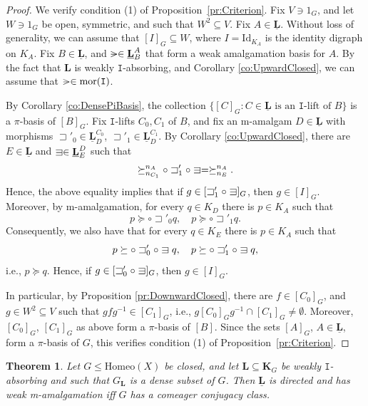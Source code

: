 \documentclass[12pt]{amsart}
\numberwithin{equation}{section}
\theoremstyle{plain}
\newtheorem{theorem}{Theorem}[section]
\theoremstyle{definition}
\newcommand{\nil}{\mathrel{\vphantom{>}\text{\mathsurround=0pt\ooalign{$>$\cr$-$\cr}}}}
\newcommand{\sqni}{\mathrel{\vphantom{\sqsupset}\text{\mathsurround=0pt\ooalign{$\sqsupset$\cr$-$\cr}}}}
\newcommand \Homeo{ \mbox{Homeo}}
\newcommand \Id{ \mbox{Id}}
\newcommand \sqsp{\sqsupset}
\newcommand \la{\leftarrow}
\newcommand \mor{{\rm{mor}}}
\newcommand \KKb{\mathbf{K}}
\newcommand \LLb{\mathbf{L}}
\newcommand \LLub{\underline{\mathbf{L}}}
\newcommand \It{\mathtt{I}}
\begin{document}
\begin{proof}
We verify condition (1) of Proposition~\ref{pr:Criterion}. Fix $V \ni 1_G$, and let $W \ni 1_G$ be open, symmetric, and such that $W^2 \subseteq V$. Fix $A \in \LLub$. Without loss of generality, we can assume that $[I]_G \subseteq W$, where $I=\Id_{K_A}$ is the identity digraph on $K_A$. Fix $B \in \LLub$, and $\nil \in \LLub^A_B$ that form a weak amalgamation basis for $A$. By the fact that $\LLb$ is weakly $\mathtt{I}$-absorbing, and Corollary \ref{co:UpwardClosed}, we can assume that $\nil \in \mor(\It)$. %

By Corollary \ref{co:DensePiBasis}, the collection $\{[C]_G: C \in \LLub \mbox{ is an } \It \mbox{-lift of } B  \}$ is a $\pi$-basis of $[B]_G$. Fix $\It$-lifts $C_0, C_1$ of $B$, and fix an m-amalgam $D \in \LLub$ with morphisms $\sqsp'_0 \in \LLub^{C_0}_D$, $\sqsp'_1 \in \LLub^{C_1}_D$. %
%
%
By Corollary \ref{co:UpwardClosed}, there are $E \in \LLub$ and $\sqni \in \LLub^D_E$ such that
%
$$ \succeq^{n_A}_{n_{C_1}} \circ \sqsp'_1 \circ \sqni = \succeq_{n_E}^{n_A}.$$
%
Hence, the above equality implies that if $g \in [\sqsp'_1 \circ \sqni]_G$, then $g \in [I]_G$. Moreover, by m-amalgamation, for every $q \in K_D$ there is $p \in K_A$ such that $$p \succeq \circ \sqsp'_0 q, \quad  p \succeq \circ \sqsp'_1 q.$$ Consequently, we also have that for every $q \in K_E$ there is $p \in K_A$ such that $$p \succeq \circ \sqsp'_0 \circ \sqni q, \quad p \succeq \circ \sqsp'_1 \circ \sqni q,$$ i.e., $p \succeq q$. Hence, if $g \in [\sqsp'_0 \circ \sqni]_G$, then $g \in [I]_G$. 

In particular, by Proposition \ref{pr:DownwardClosed}, there are $f \in [C_0]_G$, and $g \in W^2 \subseteq V$ such that $gfg^{-1} \in [C_1]_G$, i.e., $g[C_0]_Gg^{-1} \cap [C_1]_G \neq \emptyset$. Moreover, $[C_0]_G$, $[C_1]_G$ as above form a $\pi$-basis of $[B]$.  Since the sets $[A]_G$, $A\in\LLub$, form a $\pi$-basis of $G$,
this verifies condition (1) of Proposition~\ref{pr:Criterion}.
\end{proof}

\begin{theorem}
	\label{th:ComeagerDir&Amal}
Let $G \leq \Homeo(X)$ be closed, and let $\LLb \subseteq \KKb_G$ be weakly $\It$-absorbing and such that $G_\LLb$ is a dense subset of $G$. Then $\LLub$ is directed and has weak m-amalgamation iff $G$ has a comeager conjugacy class.
\end{theorem}
\end{document}
